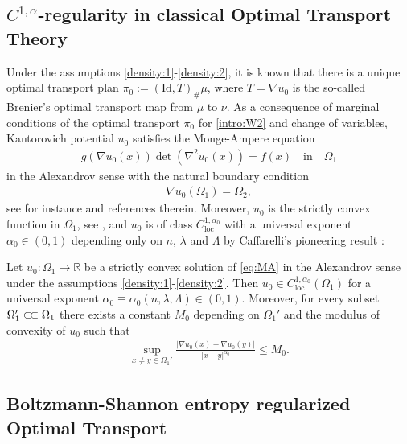 \documentclass[reqno,12pt]{article}
\DeclareMathOperator{\loc}{loc}
\newcommand{\R}{\mathbb{R}}
\newcommand{\ssubset}{\subset\joinrel\subset}
\begin{document}
\subsection{$C^{1,\alpha}$-regularity in classical Optimal Transport Theory}

 Under the assumptions \eqref{density:1}-\eqref{density:2}, it is known that there is a unique optimal transport plan $\pi_{0}:= (\text{Id},T)_{\#}\mu$, where $T = \nabla u_{0}$ is the so-called Brenier's optimal transport map from $\mu$ to $\nu$. As a consequence of marginal conditions of the optimal transport $\pi_{0}$ for \eqref{intro:W2} and change of variables, Kantorovich potential $u_{0}$ satisfies the Monge-Ampere equation 
\begin{align}
    \label{eq:MA}
    g(\nabla u_{0}(x))\det\left(\nabla^2u_{0}(x) \right) = f(x)\quad\text{in}\quad \Omega_1
\end{align}
in the Alexandrov sense with the natural boundary condition  
\begin{align*}
    \nabla u_{0}(\Omega_{1}) = \Omega_{2},
\end{align*}
see for instance \cite{Fig17, Gut16, Vil1} and references therein. Moreover, $u_{0}$ is the strictly convex function in $\Omega_{1}$, see \cite{Ca3, De13}, and $u_{0}$ is of class $C_{\loc}^{1,\alpha_0}$ with a universal exponent $\alpha_0 \in (0,1)$ depending only on $n$, $\lambda$ and $\Lambda$ by Caffarelli's pioneering result \cite{Ca2, Ca3}: 

\begin{teo}
    \label{thm:Caf}
    Let $u_0 : \Omega_1 \rightarrow \R$ be a strictly convex solution of \eqref{eq:MA} in the Alexandrov sense under the assumptions \eqref{density:1}-\eqref{density:2}. Then $u_{0}\in C^{1,\alpha_0}_{\loc}(\Omega_1)$ for a universal exponent $\alpha_0 \equiv \alpha_0 (n,\lambda,\Lambda) \in (0,1)$. Moreover, for every subset $\Omega_{1}'\ssubset \Omega_1$ there exists a constant $M_0$ depending on $\Omega_{1}'$ and the modulus of convexity of $u_0$ such that 
    \begin{align*}
        \sup\limits_{x\neq y \in \Omega_{1}'} \frac{|\nabla u_{0}(x)-\nabla u_{0}(y)|}{|x-y|^{\alpha_0}} \leqslant M_0.
    \end{align*}
\end{teo}


\subsection{Boltzmann-Shannon entropy
regularized Optimal Transport}
\end{document}
